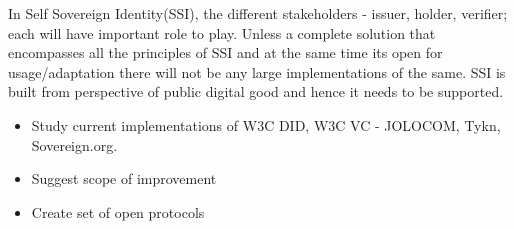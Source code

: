 In Self Sovereign Identity(SSI), the different stakeholders - issuer, holder, verifier; each will have important role to play. Unless a complete solution that encompasses all the principles of SSI and at the same time its open for usage/adaptation there will not be any large implementations of the same. SSI is built from perspective of public digital good and hence it needs to be supported.

\begin{itemize}
    \item Study current implementations of W3C DID, W3C VC - JOLOCOM, Tykn, Sovereign.org.
    \item Suggest scope of improvement
    \item Create set of open protocols 
\end{itemize}